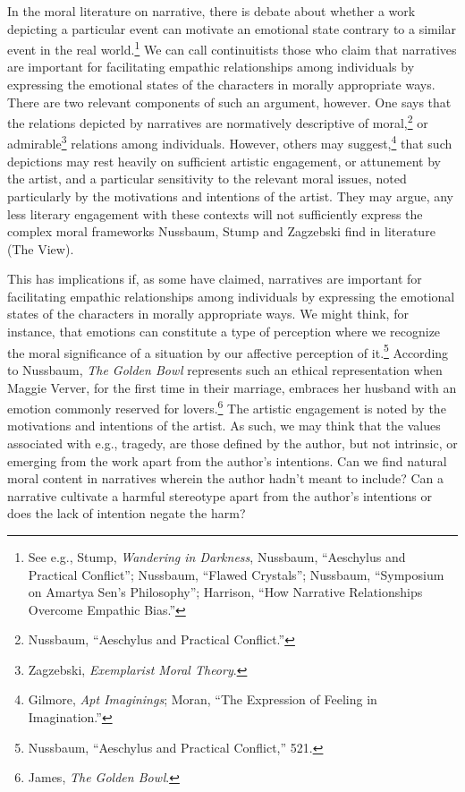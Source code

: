 \documentclass[phdthesis,12pt,final]{wuthesis}
\theoremstyle{definition}
\theoremstyle{definition}
\theoremstyle{definition}
\theoremstyle{definition}
\theoremstyle{remark}
\begin{document}
In the moral literature on narrative, there is debate about whether a work depicting a particular event can motivate an emotional state contrary to a similar event in the real world.\footnote{See e.g., Stump, \emph{Wandering in {Darkness}}, Nussbaum, {``Aeschylus and Practical Conflict''}; Nussbaum, {``Flawed {Crystals}''}; Nussbaum, {``Symposium on {Amartya Sen}'s Philosophy''}; Harrison, {``How {Narrative Relationships Overcome Empathic Bias}.''}} We can call continuitists those who claim that narratives are important for facilitating empathic relationships among individuals by expressing the emotional states of the characters in morally appropriate ways. There are two relevant components of such an argument, however. One says that the relations depicted by narratives are normatively descriptive of moral,\footnote{Nussbaum, {``Aeschylus and Practical Conflict.''}} or admirable\footnote{Zagzebski, \emph{Exemplarist {Moral Theory}}.} relations among individuals. However, others may suggest,\footnote{Gilmore, \emph{Apt {Imaginings}}; Moran, {``The {Expression} of {Feeling} in {Imagination}.''}} that such depictions may rest heavily on sufficient artistic engagement, or attunement by the artist, and a particular sensitivity to the relevant moral issues, noted particularly by the motivations and intentions of the artist. They may argue, any less literary engagement with these contexts will not sufficiently express the complex moral frameworks Nussbaum, Stump and Zagzebski find in literature (The View).

This has implications if, as some have claimed, narratives are important for facilitating empathic relationships among individuals by expressing the emotional states of the characters in morally appropriate ways. We might think, for instance, that emotions can constitute a type of perception where we recognize the moral significance of a situation by our affective perception of it.\footnote{Nussbaum, {``Aeschylus and Practical Conflict,''} 521.} According to Nussbaum, \emph{The Golden Bowl} represents such an ethical representation when Maggie Verver, for the first time in their marriage, embraces her husband with an emotion commonly reserved for lovers.\footnote{James, \emph{The Golden Bowl}.} The artistic engagement is noted by the motivations and intentions of the artist. As such, we may think that the values associated with e.g., tragedy, are those defined by the author, but not intrinsic, or emerging from the work apart from the author's intentions. Can we find natural moral content in narratives wherein the author hadn't meant to include? Can a narrative cultivate a harmful stereotype apart from the author's intentions or does the lack of intention negate the harm?
\end{document}
